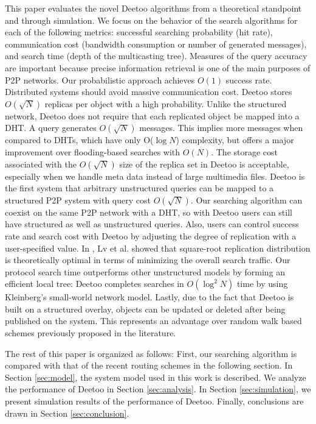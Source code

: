 This paper evaluates the novel Deetoo algorithms from a theoretical 
standpoint and through simulation. 
We focus on the behavior of the search algorithms for each of the
following metrics: successful searching probability (hit rate),
communication cost (bandwidth consumption or number of
generated messages), and search time (depth of the multicasting tree). 
Measures of the query accuracy are important because precise information 
retrieval is one of the main purposes of P2P networks. Our probabilistic approach 
achieves $O(1)$ success rate.
Distributed systems should avoid massive communication cost. Deetoo stores 
$O(\sqrt{N})$ replicas per object with a high probability. 
Unlike the structured network, Deetoo does not require that each replicated object 
be mapped into a DHT.
A query generates $O(\sqrt{N})$ messages.
This implies more messages when compared to DHTs, which have only O($\log N$) complexity,
but offers a major improvement over flooding-based searches with
$O(N)$. The storage cost associated with the $O(\sqrt{N})$ size of the replica set in Deetoo is 
acceptable, especially when we handle meta data instead of 
large multimedia files.
Deetoo is the first system that arbitrary unstructured queries can be mapped 
to a structured P2P system with query cost $O(\sqrt{N})$.
Our searching algorithm can coexist on the same P2P network
with a DHT, so with Deetoo
users can still have structured as well as unstructured queries.
Also, users can control success rate and search cost with Deetoo by 
adjusting the degree of replication with a user-specified value.
In \cite{LCKS02}, Lv et al. showed that
square-root replication distribution is theoretically optimal in
terms of minimizing the overall search traffic. 
Our protocol search time outperforms other unstructured models by forming 
an efficient local tree: 
Deetoo completes searches in  
$O(\log^2{N})$ time by using Kleinberg's small-world network model.  
Lastly, due to the fact that Deetoo is built on a structured overlay,
objects can be updated or deleted after being published on the
system.  This represents an advantage over random
walk based schemes previously proposed in the literature.

The rest of this paper is organized as follows: First, our searching
algorithm is compared with that of the recent routing schemes in the following section. 
In Section \ref{sec:model}, the system model
used in this work is described. We analyze the performance of Deetoo in
Section \ref{sec:analysis}. In Section \ref{sec:simulation}, we present
simulation results of the performance of Deetoo. Finally, conclusions are 
drawn in Section \ref{sec:conclusion}.

